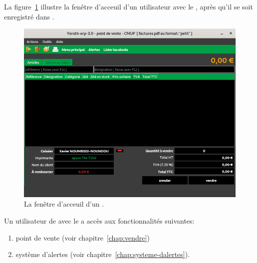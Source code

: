 \label{sec:utilisateurs-lecaissier}

La figure~\ref{fig:fenetre-principale-caissier} illustre la
fen\^etre d'acceuil d'un utilisateur avec le \role \caissier,
apr\`es qu'il se soit enregistr\'e dans \yeren.\\

\begin{figure}[!htbp]
\centering
\includegraphics[scale=0.63]{images/yeren-fenetre-caissier.png}
\caption{La fen\^etre d'acceuil d'un \caissier.}
\label{fig:fenetre-principale-caissier}
\end{figure}

Un utilisateur de \yeren avec le \role \caissier a acc\`es
aux fonctionnalit\'es suivantes:

\begin{enumerate}[1)]
	\item point de vente (voir chapitre~\ref{chap:vendre})
	\item syst\`eme d'alertes (voir chapitre~\ref{chap:systeme-dalertes}).\\
\end{enumerate}